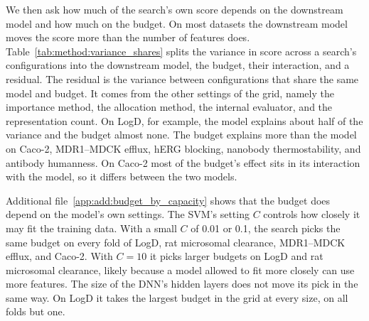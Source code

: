 We then ask how much of the search's own score depends on the downstream model and how much on the budget. On most datasets the downstream model moves the score more than the number of features does. Table~\ref{tab:method:variance_shares} splits the variance in score across a search's configurations into the downstream model, the budget, their interaction, and a residual. The residual is the variance between configurations that share the same model and budget. It comes from the other settings of the grid, namely the importance method, the allocation method, the internal evaluator, and the representation count. On LogD, for example, the model explains about half of the variance and the budget almost none. The budget explains more than the model on Caco-2, MDR1--MDCK efflux, hERG blocking, nanobody thermostability, and antibody humanness. On Caco-2 most of the budget's effect sits in its interaction with the model, so it differs between the two models.

Additional file~\ref{app:add:budget_by_capacity} shows that the budget does depend on the model's own settings. The SVM's setting $C$ controls how closely it may fit the training data. With a small $C$ of 0.01 or 0.1, the search picks the same budget on every fold of LogD, rat microsomal clearance, MDR1--MDCK efflux, and Caco-2. With $C = 10$ it picks larger budgets on LogD and rat microsomal clearance, likely because a model allowed to fit more closely can use more features. The size of the DNN's hidden layers does not move its pick in the same way. On LogD it takes the largest budget in the grid at every size, on all folds but one.

